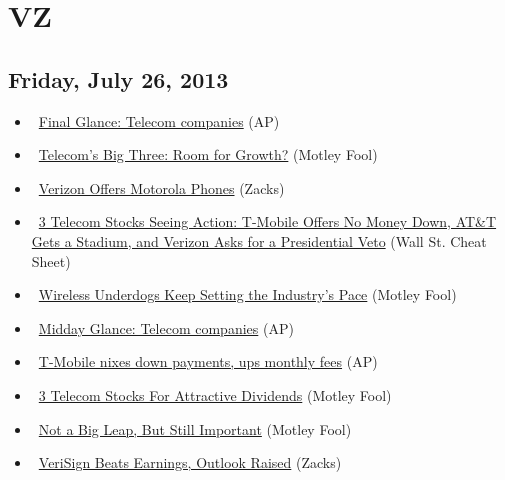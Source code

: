 \documentclass[11pt,asymmetric]{article}
\begin{document}
\section*{VZ}

\subsection*{Friday, July 26, 2013}
\begin{itemize}
\item\ \href{http://finance.yahoo.com/news/final-glance-telecom-companies-220458936.html}{Final Glance: Telecom companies} (AP)
\item\ \href{http://beta.fool.com/billedson11/2013/07/26/telecoms-big-three-room-for-growth/41456/?source=eogyholnk0000001}{Telecom's Big Three: Room for Growth?} (Motley Fool)
\item\ \href{http://finance.yahoo.com/news/verizon-offers-motorola-phones-210112260.html}{Verizon Offers Motorola Phones} (Zacks)
\item\ \href{http://wallstcheatsheet.com/stocks/3-telecom-stocks-seeing-action-t-mobile-offers-no-money-down-att-gets-a-stadium-and-verizon-asks-for-a-presidential-veto.html/?ref=YF}{3 Telecom Stocks Seeing Action: T-Mobile Offers No Money Down, AT\&T Gets a Stadium, and Verizon Asks for a Presidential Veto} (Wall St. Cheat Sheet)
\item\ \href{http://www.fool.com/investing/general/2013/07/26/wireless-underdogs-keep-setting-the-industrys-pace.aspx?source=eogyholnk0000001}{Wireless Underdogs Keep Setting the Industry's Pace} (Motley Fool)
\item\ \href{http://finance.yahoo.com/news/midday-glance-telecom-companies-174214687.html}{Midday Glance: Telecom companies} (AP)
\item\ \href{http://finance.yahoo.com/news/t-mobile-nixes-down-payments-151227918.html}{T-Mobile nixes down payments, ups monthly fees} (AP)
\item\ \href{http://beta.fool.com/ishtiaqahmed/2013/07/25/three-telecom-stocks-for-attractive-dividends/40829/?source=eogyholnk0000001}{3 Telecom Stocks For Attractive Dividends} (Motley Fool)
\item\ \href{http://beta.fool.com/reubengbrewer/2013/07/26/not-a-big-leap-but-still-important/41640/?source=eogyholnk0000001}{Not a Big Leap, But Still Important} (Motley Fool)
\item\ \href{http://finance.yahoo.com/news/verisign-beats-earnings-outlook-raised-152001947.html}{VeriSign Beats Earnings, Outlook Raised} (Zacks)

\end{itemize}
\end{document}
